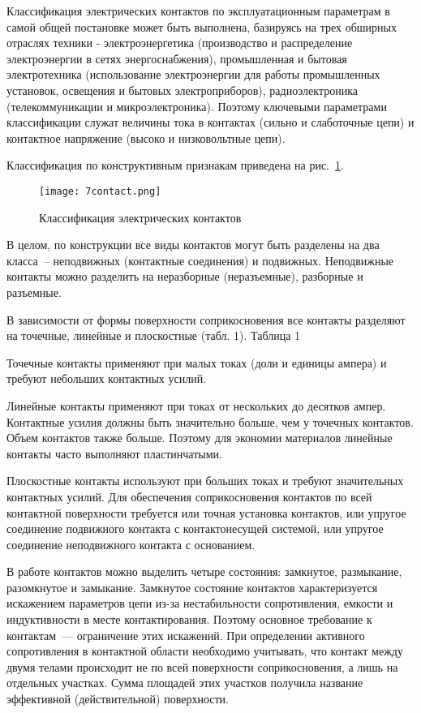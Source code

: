 Классификация электрических контактов по эксплуатационным параметрам в самой общей постановке может быть выполнена, базируясь на трех обширных отраслях техники - электроэнергетика (производство и распределение электроэнергии в сетях энергоснабжения), промышленная и бытовая электротехника (использование электроэнергии для работы промышленных установок, освещения и бытовых электроприборов), радиоэлектроника (телекоммуникации и микроэлектроника). Поэтому ключевыми параметрами классификации служат величины тока в контактах (сильно и слаботочные цепи) и контактное напряжение (высоко и низковольтные цепи).

Классификация по конструктивным признакам приведена на рис.~\ref{pic:7contact}.
\begin{figure}[h!]
	\caption{ Классификация электрических контактов }
	\texttt{[image: 7contact.png]}
	\label{pic:7contact}
\end{figure}

В целом, по конструкции все виды контактов могут быть разделены на два класса~-- неподвижных (контактные соединения) и подвижных. Неподвижные контакты можно разделить на неразборные (неразъемные), разборные и разъемные.

В зависимости от формы поверхности соприкосновения все контакты разделяют на точечные, линейные и плоскостные (табл. 1). 
Таблица 1

Точечные контакты применяют при малых токах (доли и единицы ампера) и требуют небольших контактных усилий. 

Линейные контакты применяют при токах от нескольких до десятков ампер. Контактные усилия должны быть значительно больше, чем у точечных контактов. Объем контактов также больше. Поэтому для экономии материалов линейные контакты часто выполняют пластинчатыми. 

Плоскостные контакты используют при больших токах и требуют значительных контактных усилий. Для обеспечения соприкосновения контактов по всей контактной поверхности требуется или точная установка контактов, или упругое соединение подвижного контакта с контактонесущей системой, или упругое соединение неподвижного контакта с основанием.

В работе контактов можно выделить четыре состояния: замкнутое, размыкание, разомкнутое и замыкание. Замкнутое состояние контактов характеризуется искажением параметров цепи из-за нестабильности сопротивления, емкости и индуктивности в месте контактирования. Поэтому основное требование к контактам~--- ограничение этих искажений. При определении активного сопротивления в контактной области необходимо учитывать, что контакт между двумя телами происходит не по всей поверхности соприкосновения, а лишь на отдельных участках. Сумма площадей этих участков получила название эффективной (действительной) поверхности.

